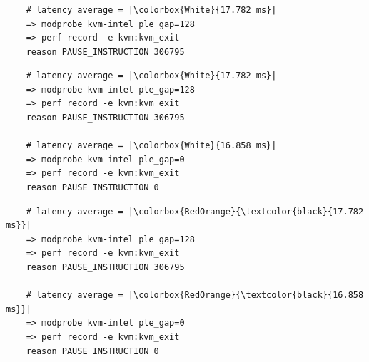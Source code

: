 \documentclass[usenames,dvipsnames, 18pt, compress, aspectratio=169]{beamer}
\begin{document}
\begin{frame}[fragile]{}
    \frametitle{}
    \begin{center}

    \begin{overprint}
        \begin{verbatim}
    # latency average = |\colorbox{White}{17.782 ms}|
    => modprobe kvm-intel ple_gap=128
    => perf record -e kvm:kvm_exit
    reason PAUSE_INSTRUCTION 306795
        \end{verbatim}

        \begin{verbatim}
    # latency average = |\colorbox{White}{17.782 ms}|
    => modprobe kvm-intel ple_gap=128
    => perf record -e kvm:kvm_exit
    reason PAUSE_INSTRUCTION 306795

    # latency average = |\colorbox{White}{16.858 ms}|
    => modprobe kvm-intel ple_gap=0
    => perf record -e kvm:kvm_exit
    reason PAUSE_INSTRUCTION 0
        \end{verbatim}

        \begin{verbatim}
    # latency average = |\colorbox{RedOrange}{\textcolor{black}{17.782 ms}}|
    => modprobe kvm-intel ple_gap=128
    => perf record -e kvm:kvm_exit
    reason PAUSE_INSTRUCTION 306795

    # latency average = |\colorbox{RedOrange}{\textcolor{black}{16.858 ms}}|
    => modprobe kvm-intel ple_gap=0
    => perf record -e kvm:kvm_exit
    reason PAUSE_INSTRUCTION 0
        \end{verbatim}

    \end{overprint}
    \end{center}
\end{frame}
\end{document}
